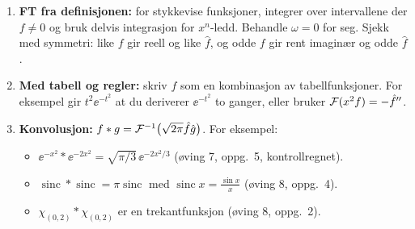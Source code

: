 \begin{oppskrift}
\begin{enumerate}
  \item \textbf{FT fra definisjonen:} for stykkevise funksjoner, integrer over intervallene der $f\neq0$ og bruk delvis integrasjon for $x^n$-ledd. Behandle $\omega=0$ for seg. Sjekk med symmetri: like $f$ gir reell og like $\hat f$, og odde $f$ gir rent imaginær og odde $\hat f$.
  \item \textbf{Med tabell og regler:} skriv $f$ som en kombinasjon av tabellfunksjoner. For eksempel gir $t^2\ee^{-t^2}$ at du deriverer $\ee^{-t^2}$ to ganger, eller bruker $\mathcal{F}(x^2f)=-\hat f''$.
  \item \textbf{Konvolusjon:} $f*g=\mathcal{F}^{-1}\bigl(\sqrt{2\pi}\hat f\hat g\bigr)$. For eksempel:
  \begin{itemize}
    \item $\ee^{-x^2}*\ee^{-2x^2}=\sqrt{\pi/3}\,\ee^{-2x^2/3}$ (øving 7, oppg.~5, kontrollregnet).
    \item $\operatorname{sinc}*\operatorname{sinc}=\pi\operatorname{sinc}$ med $\operatorname{sinc}x=\frac{\sin x}x$ (øving 8, oppg.~4).
    \item $\chi_{(0,2)}*\chi_{(0,2)}$ er en trekantfunksjon (øving 8, oppg.~2).
  \end{itemize}
\end{enumerate}
\end{oppskrift}


